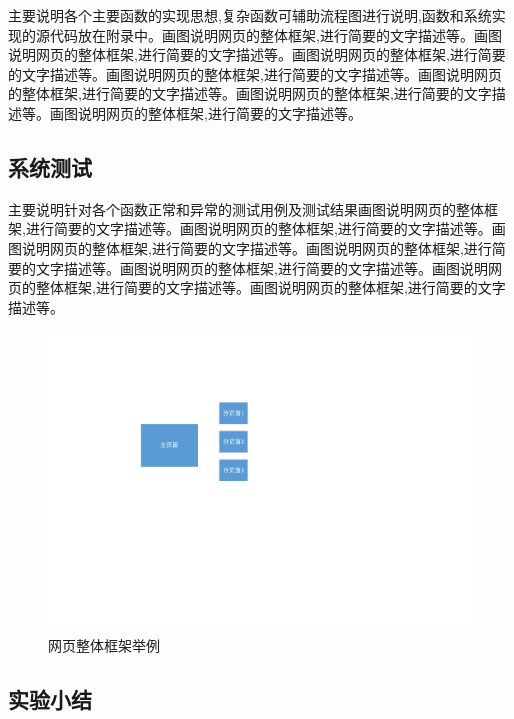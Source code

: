 \documentclass[supercite]{Experimental_Report}
\theoremstyle{definition}
\begin{document}
主要说明各个主要函数的实现思想,复杂函数可辅助流程图进行说明,函数和系统实现的源代码放在附录中。画图说明网页的整体框架,进行简要的文字描述等。画图说明网页的整体框架,进行简要的文字描述等。画图说明网页的整体框架,进行简要的文字描述等。画图说明网页的整体框架,进行简要的文字描述等。画图说明网页的整体框架,进行简要的文字描述等。画图说明网页的整体框架,进行简要的文字描述等。画图说明网页的整体框架,进行简要的文字描述等。

\subsection{系统测试}

主要说明针对各个函数正常和异常的测试用例及测试结果画图说明网页的整体框架,进行简要的文字描述等。画图说明网页的整体框架,进行简要的文字描述等。画图说明网页的整体框架,进行简要的文字描述等。画图说明网页的整体框架,进行简要的文字描述等。画图说明网页的整体框架,进行简要的文字描述等。画图说明网页的整体框架,进行简要的文字描述等。画图说明网页的整体框架,进行简要的文字描述等。

\begin{figure}[htb] %
	\begin{center}
		\includegraphics[scale=0.80]{images/1-1.pdf}
		\caption{网页整体框架举例}
		\label{fig5-1}
	\end{center}
\end{figure}

\subsection{实验小结}

\newpage
\end{document}
